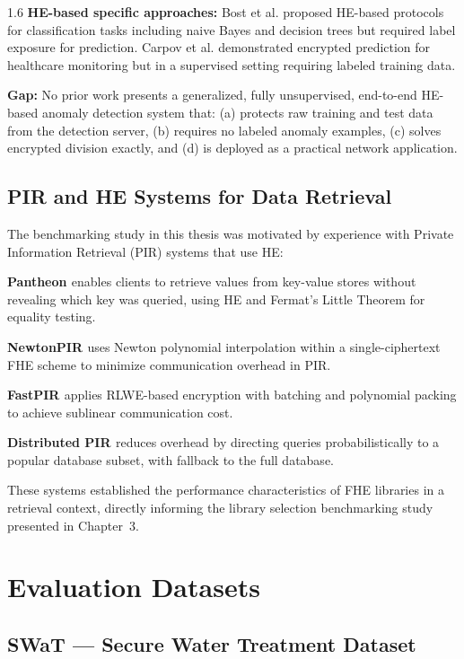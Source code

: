 \begin{spacing}{1.6}
\textbf{HE-based specific approaches:} Bost et al. \cite{bost2015} proposed
HE-based protocols for classification tasks including naive Bayes and
decision trees but required label exposure for prediction. Carpov et al.
\cite{carpov2019} demonstrated encrypted prediction for healthcare monitoring
but in a supervised setting requiring labeled training data.

\textbf{Gap:} No prior work presents a generalized, fully unsupervised,
end-to-end HE-based anomaly detection system that: (a) protects raw training
and test data from the detection server, (b) requires no labeled anomaly
examples, (c) solves encrypted division exactly, and (d) is deployed as a
practical network application.

\subsection{PIR and HE Systems for Data Retrieval}

The benchmarking study in this thesis was motivated by experience with Private
Information Retrieval (PIR) systems that use HE:

\textbf{Pantheon \cite{pantheon}} enables clients to retrieve values from
key-value stores without revealing which key was queried, using HE and Fermat's
Little Theorem for equality testing.

\textbf{NewtonPIR \cite{newtonPIR}} uses Newton polynomial interpolation within
a single-ciphertext FHE scheme to minimize communication overhead in PIR.

\textbf{FastPIR \cite{fastPIR}} applies RLWE-based encryption with batching
and polynomial packing to achieve sublinear communication cost.

\textbf{Distributed PIR \cite{distributedPIR}} reduces overhead by directing
queries probabilistically to a popular database subset, with fallback to the
full database.

These systems established the performance characteristics of FHE libraries
in a retrieval context, directly informing the library selection benchmarking
study presented in Chapter~3.

\section{Evaluation Datasets}

\subsection{SWaT --- Secure Water Treatment Dataset}


\end{spacing}
